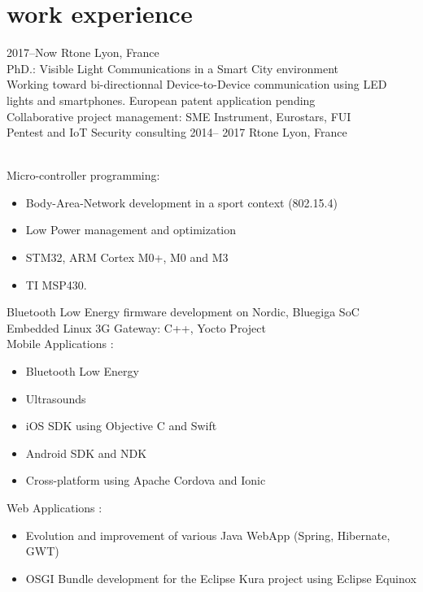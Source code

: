 \documentclass[]{cv-style}          %
\begin{document}
\section{work experience}

\begin{entrylist}
\entry
  {2017--Now}
  {Rtone}
  {Lyon, France}
  {\\
  PhD.: Visible Light Communications in a Smart City environment\\
  Working toward bi-directionnal Device-to-Device communication using LED lights and smartphones. European patent application pending\\
  Collaborative project management: SME Instrument, Eurostars, FUI\\
  Pentest and IoT Security consulting}
\entry
  {2014-- 2017}
  {Rtone}
  {Lyon, France}
  {\\
  Micro-controller programming:
  \begin{itemize}
    \item Body-Area-Network development in a sport context (802.15.4)
    \item Low Power management and optimization
    \item STM32, ARM Cortex M0+, M0 and M3
    \item TI MSP430.
  \end{itemize}
  Bluetooth Low Energy firmware development on Nordic, Bluegiga SoC\\
  Embedded Linux 3G Gateway: C++, Yocto Project\\
  Mobile Applications :
  \begin{itemize}
    \item Bluetooth Low Energy
    \item Ultrasounds
    \item iOS SDK using Objective C and Swift
    \item Android SDK and NDK
    \item Cross-platform using Apache Cordova and Ionic
  \end{itemize}
  Web Applications :
  \begin{itemize}
    \item Evolution and improvement of various Java WebApp (Spring, Hibernate, GWT)
    \item OSGI Bundle development for the Eclipse Kura project using Eclipse Equinox

\end{itemize}}
\end{entrylist}
\end{document}
